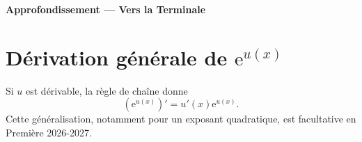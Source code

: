 
\begin{center}\textbf{Approfondissement — Vers la Terminale}\end{center}
\section*{Dérivation générale de $\mathrm{e}^{u(x)}$}

Si $u$ est dérivable, la règle de chaîne donne
\[
(\mathrm{e}^{u(x)})'=u'(x)\mathrm{e}^{u(x)}.
\]
Cette généralisation, notamment pour un exposant quadratique, est facultative
en Première 2026-2027.


